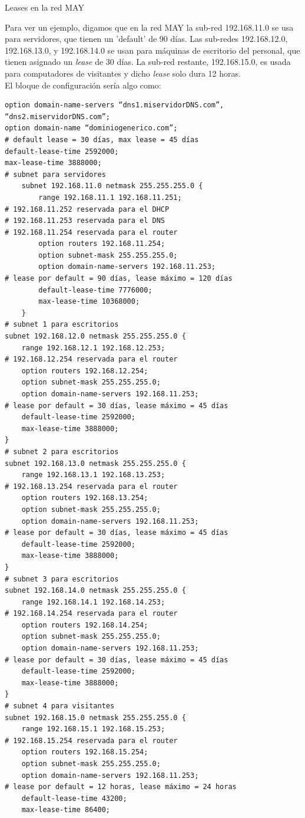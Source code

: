 \begin{frame}{Leases en la red MAY}

    Para ver un ejemplo, digamos que en la red MAY la sub-red 192.168.11.0 se usa para servidores,
    que tienen un 'default' de 90 días. Las sub-redes 192.168.12.0, 192.168.13.0,
    y 192.168.14.0 se usan para máquinas de escritorio del personal, que tienen
    asignado un \textit{lease} de 30 días. La sub-red restante, 192.168.15.0, es
    usada para computadores de visitantes y dicho \textit{lease} solo dura 12 horas.\\[0.2cm]

    El bloque de configuración sería algo como:
\begin{verbatim}
option domain-name-servers “dns1.miservidorDNS.com”,
“dns2.miservidorDNS.com”;
option domain-name “dominiogenerico.com”;
# default lease = 30 días, max lease = 45 días
default-lease-time 2592000;
max-lease-time 3888000;
# subnet para servidores
    subnet 192.168.11.0 netmask 255.255.255.0 {
        range 192.168.11.1 192.168.11.251;
# 192.168.11.252 reservada para el DHCP 
# 192.168.11.253 reservada para el DNS 
# 192.168.11.254 reservada para el router 
        option routers 192.168.11.254;
        option subnet-mask 255.255.255.0;
        option domain-name-servers 192.168.11.253;
# lease por default = 90 días, lease máximo = 120 días
        default-lease-time 7776000;
        max-lease-time 10368000;
    }
# subnet 1 para escritorios
subnet 192.168.12.0 netmask 255.255.255.0 {
    range 192.168.12.1 192.168.12.253;
# 192.168.12.254 reservada para el router 
    option routers 192.168.12.254;
    option subnet-mask 255.255.255.0;
    option domain-name-servers 192.168.11.253;
# lease por default = 30 días, lease máximo = 45 días
    default-lease-time 2592000;
    max-lease-time 3888000;
}
# subnet 2 para escritorios
subnet 192.168.13.0 netmask 255.255.255.0 {
    range 192.168.13.1 192.168.13.253;
# 192.168.13.254 reservada para el router 
    option routers 192.168.13.254;
    option subnet-mask 255.255.255.0;
    option domain-name-servers 192.168.11.253;
# lease por default = 30 días, lease máximo = 45 días
    default-lease-time 2592000;
    max-lease-time 3888000;
}
# subnet 3 para escritorios
subnet 192.168.14.0 netmask 255.255.255.0 {
    range 192.168.14.1 192.168.14.253;
# 192.168.14.254 reservada para el router 
    option routers 192.168.14.254;
    option subnet-mask 255.255.255.0;
    option domain-name-servers 192.168.11.253;
# lease por default = 30 días, lease máximo = 45 días
    default-lease-time 2592000;
    max-lease-time 3888000;
}
# subnet 4 para visitantes
subnet 192.168.15.0 netmask 255.255.255.0 {
    range 192.168.15.1 192.168.15.253;
# 192.168.15.254 reservada para el router 
    option routers 192.168.15.254;
    option subnet-mask 255.255.255.0;
    option domain-name-servers 192.168.11.253;
# lease por default = 12 horas, lease máximo = 24 horas
    default-lease-time 43200;
    max-lease-time 86400;
\end{verbatim}


\end{frame}
